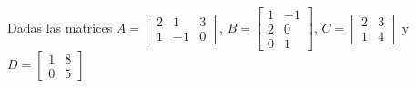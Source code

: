 \documentclass[addpoints,spanish, 12pt,a4paper]{exam}
\begin{document}
\begin{questions}


\question Dadas las matrices  $A=\left[\begin{matrix}2 & 1 & 3\\1 & -1 & 0\end{matrix}\right]$,  $B=\left[\begin{matrix}1 & -1\\2 & 0\\0 & 1\end{matrix}\right]$, $C=\left[\begin{matrix}2 & 3\\1 & 4\end{matrix}\right]$ y $D=\left[\begin{matrix}1 & 8\\0 & 5\end{matrix}\right]$ 

\begin{parts}

\end{parts}
\end{questions}
\end{document}
